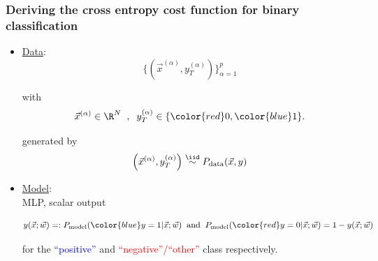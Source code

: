 \begin{frame}\frametitle{\subsubsecname\\Deriving the cross entropy cost function for binary classification}


\begin{itemize}
\item[]\underline{Data}:\\

\begin{equation}
\Big\{ \left( \vec x^{(\alpha)}, y_T^{(\alpha)} \right) \Big \}_{\alpha=1}^{p}
\end{equation}

with 
$$
\vec x^{(\alpha)} \in \R^N\;\;,\;\; y_T^{(\alpha)} \in \{{\color{red}0}, {\color{blue}1}\}.
$$

generated by
\begin{equation}
\left( \vec x^{(\alpha)}, y_T^{(\alpha)} \right) \stackrel{\iid}{\sim} P_{\text{data}}(\vec x, y)
\end{equation}

\pause

\item[]\underline{Model}:\\

MLP, scalar output 

\begin{equation}
y(\vec x;\vec w) =: P_{\text{model}} ({\color{blue}y=1}|\vec x;\vec w) \;\; \text{and} \;\; P_{\text{model}} ({\color{red}y=0}|\vec x; \vec w) = 1-y(\vec x;\vec w)
\end{equation}

for the \textcolor{blue}{``positive''} and \textcolor{red}{``negative''/``other''} class respectively.

\end{itemize}

\end{frame}

